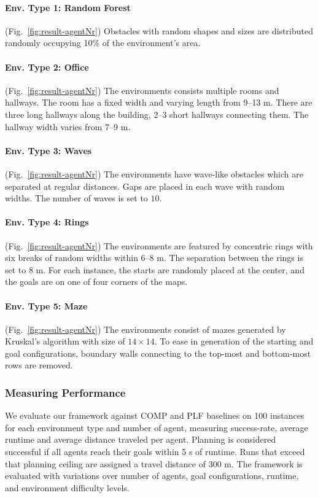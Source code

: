 \documentclass[letterpaper, 10 pt, conference]{ieeeconf}  %
\begin{document}
\paragraph{Env. Type 1: Random Forest} (Fig.~\ref{fig:result-agentNr}) Obstacles with random shapes and sizes are distributed randomly occupying 10\% of the environment's area.

\paragraph{Env. Type 2: Office} (Fig.~\ref{fig:result-agentNr}) The environments consists multiple rooms and hallways. The room has a fixed width and varying length from 9--13 m. There are three long hallways along the building, 2--3 short hallways connecting them. The hallway width varies from 7--9 m.   

\paragraph{Env. Type 3: Waves} (Fig.~\ref{fig:result-agentNr}) The environments have wave-like obstacles which are separated at regular distances. Gaps are placed in each wave with random widths. The number of waves is set to $10$.

\paragraph{Env. Type 4: Rings} (Fig.~\ref{fig:result-agentNr}) The environments are featured by concentric rings with six breaks of random widths within 6--8 m. The separation between the rings is set to 8 m. For each instance, the starts are randomly placed at the center, and the goals are on one of four corners of the maps.

\paragraph{Env. Type 5: Maze} (Fig.~\ref{fig:result-agentNr}) The environments consist of mazes generated by Kruskal's algorithm with size of $14 \times 14$. To ease in generation of the starting and goal configurations, boundary walls connecting to the top-most and bottom-most rows are removed.

\subsubsection{Measuring Performance} 
We evaluate our framework against COMP and PLF baselines on 100 instances for each environment type and number of agent, measuring success-rate, average runtime and average distance traveled per agent. 
Planning is considered successful if all agents reach their goals within 5 s of runtime. Runs that exceed that planning ceiling are assigned a travel distance of 300 m.
The framework is evaluated with variations over number of agents, goal configurations, runtime, and environment difficulty levels. 
\end{document}
